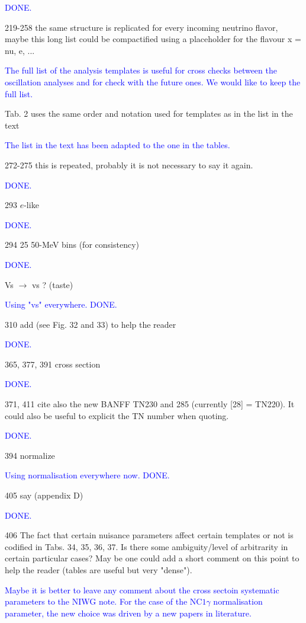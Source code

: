 \documentclass[final]{elsarticle}
\begin{document}
\textcolor{blue}{DONE.}

219-258 the same structure is replicated for every incoming neutrino flavor, maybe this long 
list could be compactified using a placeholder for the flavour x = nu, e, ...

\textcolor{blue}{The full list of the analysis templates is useful for cross checks between the oscillation analyses
and for check with the future ones. We would like to keep the full list.}

Tab. 2 uses the same order and notation used for templates as in the list in the text

\textcolor{blue}{The list in the text has been adapted to the one in the tables.}

272-275 this is repeated, probably it is not necessary to say it again.

\textcolor{blue}{DONE.}

293 $e$-like

\textcolor{blue}{DONE.}

294 25 50-MeV bins (for consistency)

\textcolor{blue}{DONE.}

Vs $\rightarrow$ vs ? (taste)

\textcolor{blue}{Using "vs" everywhere. DONE.}

310 add (see Fig. 32 and 33) to help the reader

\textcolor{blue}{DONE.}

365, 377, 391 cross section

\textcolor{blue}{DONE.}

371, 411 cite also the new BANFF TN230 and 285 (currently [28] = TN220). It could also be useful to
explicit the TN number when quoting.

\textcolor{blue}{DONE.}

394 normalize

\textcolor{blue}{Using normalisation everywhere now. DONE.}

405 say (appendix D)

\textcolor{blue}{DONE.}

406 The fact that certain nuisance parameters affect certain templates
or not is codified in Tabs. 34, 35, 36, 37.  Is there some
ambiguity/level of arbitrarity in certain particular cases? May be
one could add a short comment on this point to help the reader (tables
are useful but very "dense").

\textcolor{blue}{Maybe it is better to leave any comment about the cross sectoin systematic
parameters to the NIWG note.
For the case of the NC$1\gamma$ normalisation parameter, the new choice was driven by a new papers in literature.}
\end{document}
